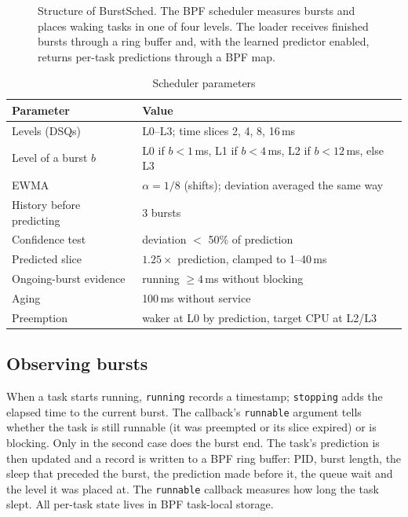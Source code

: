 \documentclass[conference]{IEEEtran}
\newcommand{\ms}{\,ms}
\newcommand{\code}[1]{\texttt{\small #1}}
\begin{document}
\begin{figure}[t]
\caption{Structure of BurstSched. The BPF scheduler measures bursts and places waking tasks in
one of four levels. The loader receives finished bursts through a ring buffer and, with the
learned predictor enabled, returns per-task predictions through a BPF map.}
\label{fig:arch}
\end{figure}

\begin{table}[t]
\caption{Scheduler parameters}
\label{tab:params}
\centering
\footnotesize
\begin{tabular}{@{}lp{4.55cm}@{}}
\toprule
Parameter & Value \\
\midrule
Levels (DSQs) & L0--L3; time slices 2, 4, 8, 16\ms \\
Level of a burst $b$ & L0 if $b<1$\ms, L1 if $b<4$\ms, L2 if $b<12$\ms, else L3 \\
EWMA & $\alpha = 1/8$ (shifts); deviation averaged the same way \\
History before predicting & 3 bursts \\
Confidence test & deviation $<$ 50\% of prediction \\
Predicted slice & $1.25\times$ prediction, clamped to 1--40\ms \\
Ongoing-burst evidence & running $\ge 4$\ms{} without blocking \\
Aging & 100\ms{} without service \\
Preemption & waker at L0 by prediction, target CPU at L2/L3 \\
\bottomrule
\end{tabular}
\end{table}

\subsection{Observing bursts}

When a task starts running, \code{running} records a timestamp; \code{stopping} adds the
elapsed time to the current burst. The callback's \code{runnable} argument tells whether the task
is still runnable (it was preempted or its slice expired) or is blocking. Only in the second
case does the burst end. The task's prediction is then updated and a record is written to a BPF
ring buffer: PID, burst length, the sleep that preceded the burst, the prediction made before
it, the queue wait and the level it was placed at. The \code{runnable} callback measures how long
the task slept. All per-task state lives in BPF task-local storage.
\end{document}
